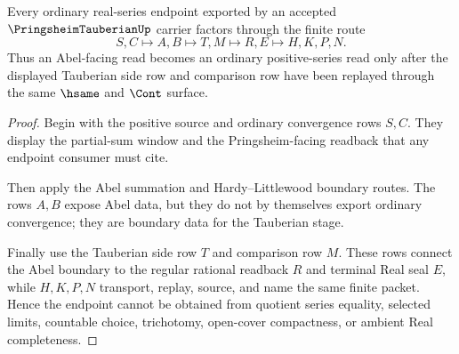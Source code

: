 \begin{theorem}
\label{thm:pringsheim-tauberian-abel-handoff}
Every ordinary real-series endpoint exported by an accepted $\PringsheimTauberianUp$ carrier factors through the finite route
$$
S,C \longmapsto A,B \longmapsto T,M \longmapsto R,E \longmapsto H,K,P,N .
$$
Thus an Abel-facing read becomes an ordinary positive-series read only after the displayed Tauberian side row and comparison row have been replayed through the same $\hsame$ and $\Cont$ surface.
\end{theorem}
\begin{proof}
Begin with the positive source and ordinary convergence rows $S,C$. They display the partial-sum window and the Pringsheim-facing readback that any endpoint consumer must cite.

Then apply the Abel summation and Hardy--Littlewood boundary routes. The rows $A,B$ expose Abel data, but they do not by themselves export ordinary convergence; they are boundary data for the Tauberian stage.

Finally use the Tauberian side row $T$ and comparison row $M$. These rows connect the Abel boundary to the regular rational readback $R$ and terminal Real seal $E$, while $H,K,P,N$ transport, replay, source, and name the same finite packet. Hence the endpoint cannot be obtained from quotient series equality, selected limits, countable choice, trichotomy, open-cover compactness, or ambient Real completeness.
\end{proof}




